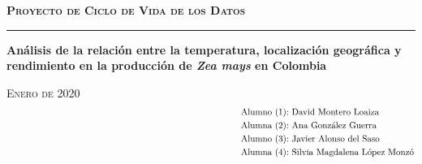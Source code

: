 \documentclass[12pt, spanish]{article}
\begin{document}
\begin{titlepage}
	\centering
	\vspace{1cm}
	{\LARGE\bfseries \textsc{Proyecto de Ciclo de Vida de los Datos}\par}
	
	\noindent\rule{15cm}{1pt}
	\vspace{3cm}
	
	{\Large \textbf{Análisis de la relación entre la temperatura, localización geográfica y rendimiento en la producción de \textit{Zea mays} en Colombia}\par}
	\vfill
	\begin{flushright}
	{\large \textsc{Enero de 2020}} \\
	\vspace{\baselineskip}
	 \begin{align*}
	 \hspace{8.5cm}& & & &\text{Alumno (1):} &\ \text{David Montero Loaiza}\\
	 \hspace{8.5cm}& & & &\text{Alumna (2):} &\ \text{Ana González Guerra}\\
	& & & &\text{Alumno (3):} &\ \text{Javier Alonso del Saso}\\
	& & & &\text{Alumna (4):} &\ \text{Silvia Magdalena López Monzó}\\
	 \end{align*}
	\end{flushright}
\end{titlepage}
\renewcommand{\refname}{Referencias} %

%

\renewcommand{\contentsname}{Índice}

\pagestyle{headings}%

\setlength{\parskip}{1em} %
\tableofcontents 
\listoftables
\end{document}
